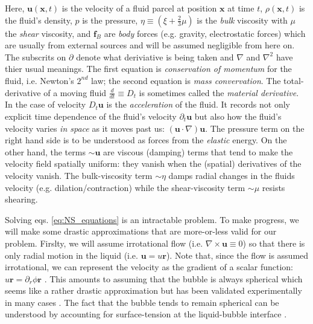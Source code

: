 \documentclass[rmp,aps,nofootinbib,superscriptaddress,floatfix,10pt]{revtex4-2}
\begin{document}
Here, $\bm{u}(\bm{x},t)$ is the velocity of a fluid parcel at position $\bm{x}$ at time $t$, $\rho (\bm{x},t)$ is the fluid's density, $p$ is the pressure, $\eta \equiv \left(\xi + \frac{2}{3}\mu \right)$ is the \emph{bulk} viscosity with $\mu$ the \emph{shear} viscosity, and $\bm{f}_B$ are \emph{body} forces (e.g. gravity, electrostatic forces) which are usually from external sources and will be assumed negligible from here on. The subscrits on $\partial$ denote what deriviative is being taken and $\nabla$ and $\nabla^2$ have thier usual meanings. The first equation is \emph{conservation of momentum} for the fluid, i.e. Newton's $2^{nd}$ law; the second equation is \emph{mass convervation}. The total-derivative of a moving fluid $\frac{d}{dt}\equiv D_t$ is sometimes called the \emph{material derivative}. In the case of velocity $D_t \bm{u}$ is the \emph{acceleration} of the fluid. It records not only explicit time dependence of the fluid's velocity $\partial_t \bm{u}$ but also how the fluid's velocity varies \emph{in space} as it moves past us: $\left( \bm{u}\cdot\nabla \right) \bm{u}$. The pressure term on the right hand side is to be understood as forces from the \emph{elastic} energy. On the other hand, the terms $\sim \bm{u}$ are viscous (damping) terms that tend to make the velocity field spatially uniform: they vanish when the (spatial) derivatives of the velocity vanish. The bulk-viscosity term $\sim \eta$ damps radial changes in the fluids velocity (e.g. dilation/contraction) while the shear-viscosity term $\sim\mu$ resists shearing. 

Solving eqs. \ref{eq:NS_equations} is an intractable problem. To make progress, we will make some drastic approximations that are more-or-less valid for our problem. Firslty, we will assume irrotational flow (i.e. $\nabla\times\bm{u}\equiv 0$) so that there is only radial motion in the liquid (i.e. $\bm{u}=u\bm{r}$). Note that, since the flow is assumed irrotational, we can represent the velocity as the gradient of a scalar function: $u\bm{r}=\partial_r \phi \bm{r}$ \cite{jackson1999classical}. This amounts to assuming that the bubble is always spherical which seems like a rather drastic approximation but has been validated experimentally in many cases \cite{}. The fact that the bubble tends to remain spherical can be understood by accounting for surface-tension at the liquid-bubble interface \cite{prosperetti1999old}. 
\end{document}

